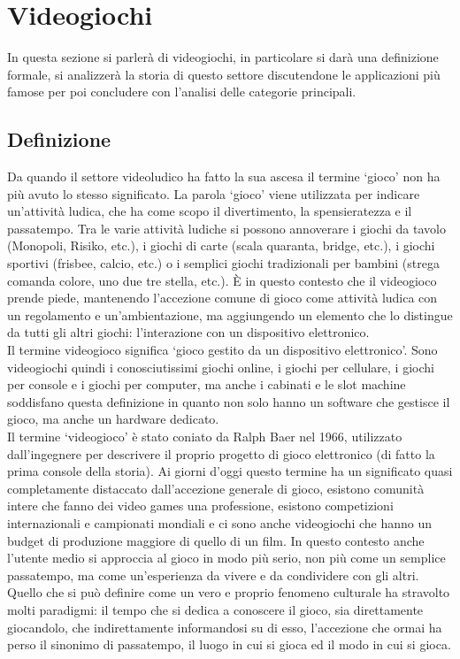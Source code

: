 \section{Videogiochi}\label{sec:Videogiochi}
    In questa sezione si parlerà di videogiochi, in particolare si darà una definizione formale, si analizzerà la storia di questo settore discutendone le applicazioni più famose per 
    poi concludere con l'analisi delle categorie principali.
    
    \subsection{Definizione}\label{subsec:VideogiochiDef}
        Da quando il settore videoludico ha fatto la sua ascesa il termine `gioco' non ha più avuto lo stesso significato. La parola `gioco' viene utilizzata per indicare un'attività 
        ludica, che ha come scopo il divertimento, la spensieratezza e il passatempo. Tra le varie attività ludiche si possono annoverare i giochi da tavolo (Monopoli, Risiko, etc.), i 
        giochi di carte (scala quaranta, bridge, etc.), i giochi sportivi (frisbee, calcio, etc.) o i semplici giochi tradizionali per bambini (strega comanda colore, uno due tre stella, etc.).
        È in questo contesto che il videogioco prende piede, mantenendo l'accezione comune di gioco come attività ludica con un regolamento e un'ambientazione, ma aggiungendo un elemento
        che lo distingue da tutti gli altri giochi: l'interazione con un dispositivo elettronico. \\
        Il termine videogioco significa `gioco gestito da un dispositivo elettronico'. Sono videogiochi quindi i conosciutissimi giochi online, i giochi per cellulare, i giochi per console 
        e i giochi per computer, ma anche i cabinati e le slot machine soddisfano questa definizione in quanto non solo hanno un software che gestisce il gioco, ma anche un hardware dedicato.\\
        Il termine `videogioco' è stato coniato da Ralph Baer nel 1966, utilizzato dall'ingegnere per descrivere il proprio progetto di gioco elettronico (di fatto la prima console della storia).
        Ai giorni d'oggi questo termine ha un significato quasi completamente distaccato dall'accezione generale di gioco, esistono comunità intere che fanno dei video games una professione,
        esistono competizioni internazionali e campionati mondiali e ci sono anche videogiochi che hanno un budget di produzione maggiore di quello di un film. In questo contesto anche l'utente
        medio si approccia al gioco in modo più serio, non più come un semplice passatempo, ma come un'esperienza da vivere e da condividere con gli altri. Quello che si può definire come
        un vero e proprio fenomeno culturale ha stravolto molti paradigmi: il tempo che si dedica a conoscere il gioco, sia direttamente giocandolo, che indirettamente informandosi su di esso,
        l'accezione che ormai ha perso il sinonimo di passatempo, il luogo in cui si gioca ed il modo in cui si gioca.\\ 


